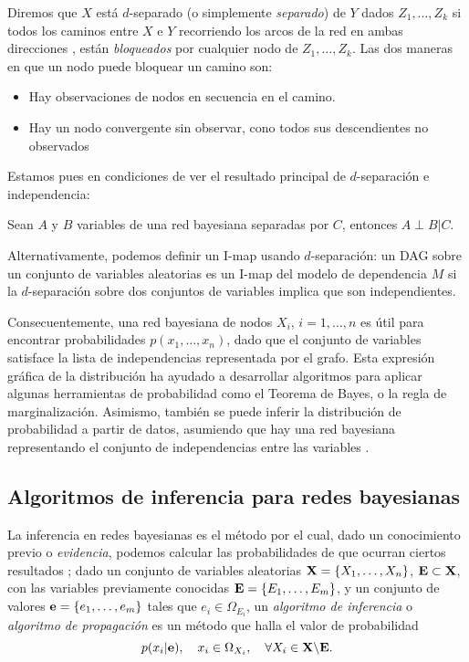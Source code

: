 Diremos que $X$ está $d$-separado (o simplemente {\em separado}) de $Y$ dados $Z_1, \dots, Z_k$ si todos los 
caminos entre $X$ e $Y$ recorriendo los arcos de la red en ambas direcciones , están {\em bloqueados} por cualquier 
nodo de $Z_1, \ldots, Z_k$. Las dos maneras en que un nodo puede bloquear un camino son: 

\begin{itemize}
\item Hay observaciones de nodos en secuencia en el camino.
\item Hay un nodo convergente sin observar, cono todos sus descendientes no observados
\end{itemize}

Estamos pues en condiciones de ver el resultado principal de $d$-separación e independencia:

\begin{teorema}
    Sean $A$ y $B$ variables de una red bayesiana separadas por $C$, entonces $A \perp B | C$.
\end{teorema}
    
Alternativamente, podemos definir un I-map usando $d$-separación: un DAG sobre un conjunto de variables 
aleatorias es un I-map del modelo de dependencia $M$ si la $d$-separación sobre dos conjuntos de variables 
implica que son independientes.
    
Consecuentemente, una red bayesiana de nodos $X_i$, $i = 1, \ldots , n$ es útil para encontrar probabilidades 
$p(x_1, \ldots, x_n)$, dado que el conjunto de variables satisface la lista de independencias representada por 
el grafo. Esta expresión gráfica de la distribución ha ayudado a desarrollar algoritmos para aplicar algunas 
herramientas de probabilidad como el Teorema de Bayes, o la regla de marginalización. Asimismo, también se 
puede inferir la 
distribución de probabilidad a partir de datos, asumiendo que hay una red bayesiana representando el conjunto 
de independencias entre las variables \cite{buntine}.
    
\subsection{Algoritmos de inferencia para redes bayesianas}
    
La inferencia en redes bayesianas es el método por el cual, dado un conocimiento previo o {\em evidencia}, 
podemos calcular las probabilidades de que ocurran ciertos resultados \cite{pearl88}; dado un conjunto de 
variables aleatorias ${\bf X} = \{X_1, \dots, X_n\}$, ${\bf E} \subset {\bf X}$, con las variables previamente 
conocidas ${\bf E} = \{E_1,\dots, E_m\}$, y un conjunto de valores ${\bf e} = \{e_1, \dots, e_m\}$ tales que 
$e_i \in \Omega_{E_i}$, un {\em algoritmo de inferencia} o {\em algoritmo de propagación} es un método que halla 
el valor de probabilidad 
$$p(x_i|{\bf e}), \quad x_i \in \Omega_{X_i}, \quad \forall X_i \in {\bf X} \backslash {\bf E}.$$

